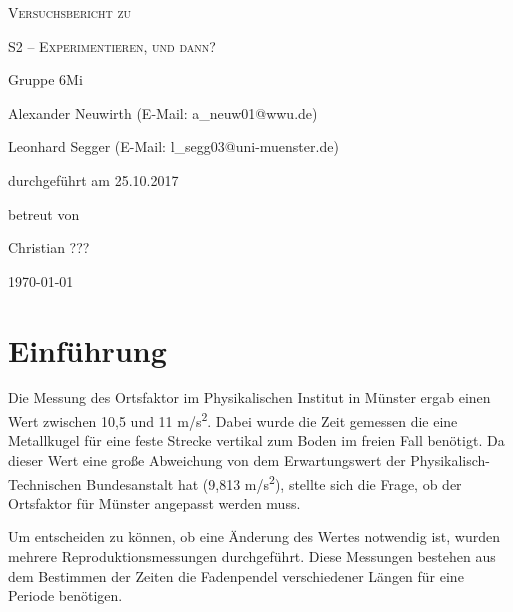 \documentclass[
	a4paper,
	12pt,
	pagesize,
	ngerman
]{scrartcl}
\begin{document}
	\begin{titlepage}
		\centering
		{\scshape\LARGE Versuchsbericht zu \par}
		\vspace{1cm}
		{\scshape\huge S2 -- Experimentieren, und dann?\par}
		\vspace{2.5cm}
		{\LARGE Gruppe 6Mi \par}
		\vspace{0.5cm}
		
		{\large Alexander Neuwirth (E-Mail: a\_neuw01@wwu.de) \par}
		{\large Leonhard Segger (E-Mail: l\_segg03@uni-muenster.de) \par}
		\vfill
		
		durchgeführt am 25.10.2017\par
		betreut von\par
		{\large Christian \textsc{???}} %
		
		\vfill
		
		{\large \today\par}
	\end{titlepage}
	\tableofcontents
	
	\newpage
	\section{Einführung}
	
	Die Messung des Ortsfaktor im Physikalischen Institut in Münster ergab einen Wert zwischen 10,5 und 11 \si{m/s^2}. Dabei wurde die Zeit gemessen die eine Metallkugel für eine feste Strecke vertikal zum Boden im freien Fall benötigt. Da dieser Wert eine große Abweichung von dem Erwartungswert der Physikalisch-Technischen Bundesanstalt hat (9,813 \si{m/s^2}), stellte sich die Frage, ob der Ortsfaktor für Münster angepasst werden muss.\par 
	Um entscheiden zu können, ob eine Änderung des Wertes notwendig ist, wurden mehrere Reproduktionsmessungen durchgeführt. Diese Messungen bestehen aus dem Bestimmen der Zeiten die Fadenpendel verschiedener Längen für eine Periode benötigen.  
	

	\newpage
\end{document}
